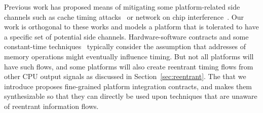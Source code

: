 Previous work has proposed means of mitigating some platform-related side channels such as cache timing attacks~\cite{kar2023mitigating,saileshwar2021mirage,giner2023scatter,werner2019scattercache,qureshi2018ceaser} or network on chip interference~\cite{wassel2013surfnoc,wang2012efficient,schoeberl2012statically,psarras2015phasenoc,alonso2019low,sadeghi2019toward}.
Our work is orthogonal to these works and models a platform that is tolerated to have a specific set of potential side channels.
Hardware-software contracts and some constant-time techniques~\cite{guarnieri2021hardware,wang2023specification,tan2025contractshadowlogic} typically consider the assumption that addresses of memory operations might eventually influence timing.
But not all platforms will have such flows, and some platforms will also create reentrant timing flows from other CPU output signals as discussed in Section~\ref{sec:reentrant}.
The \PICI that we introduce proposes fine-grained platform integration contracts, and makes them synthesizable so that they can directly be used upon techniques that are unaware of reentrant information flows.
